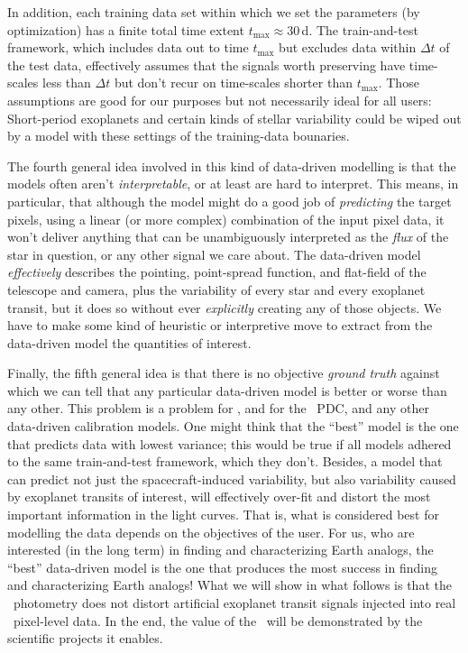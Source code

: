 In addition, 
  each training data set within which we set the parameters (by optimization) has a finite total time extent $t_{\max}\approx 30$\,d.
The train-and-test framework, which includes data out to time $t_{\max}$ but excludes data within $\Delta t$ of the test data,
  effectively assumes that the signals worth preserving have time-scales less than $\Delta t$ 
  but don't recur on time-scales shorter than $t_{\max}$.
Those assumptions are good for our purposes but not necessarily ideal for all users:
Short-period exoplanets and certain kinds of stellar variability
  could be wiped out by a model with these settings of the training-data bounaries.

The fourth general idea involved in this kind of data-driven modelling is that the models often aren't \emph{interpretable}, 
  or at least are hard to interpret.
This means, in particular, that although the model might do a good job of \emph{predicting} the target pixels,
  using a linear (or more complex) combination of the input pixel data,
  it won't deliver anything that can be unambiguously interpreted as the \emph{flux} of the star in question,
  or any other signal we care about.
The data-driven model \emph{effectively} describes the pointing, point-spread function, and flat-field
  of the telescope and camera,
  plus the variability of every star and every exoplanet transit,
  but it does so without ever \emph{explicitly} creating any of those objects.
We have to make some kind of heuristic or interpretive move to extract from the data-driven model the quantities of interest.

Finally, the fifth general idea is that there is no objective \emph{ground truth} against which we can tell
  that any particular data-driven model is better or worse than any other.
This problem is a problem for \name, and for the \Kepler\ PDC, and any other data-driven calibration models.
One might think that the ``best'' model is the one that predicts data with lowest variance;
  this would be true if all models adhered to the same train-and-test framework, which they don't.
Besides, a model that can predict not just the spacecraft-induced variability,
  but also variability caused by exoplanet transits of interest, will effectively over-fit and distort the most important information in the light curves.
That is, what is considered best for modelling the data depends on the objectives of the user.
For us, who are interested (in the long term) in finding and characterizing Earth analogs,
  the ``best'' data-driven model is the one that produces the most success in finding and characterizing Earth analogs!
What we will show in what follows is that the \name\ photometry does not distort
  artificial exoplanet transit signals injected into real \Kepler\ pixel-level data.
In the end, the value of the \name\ will be demonstrated by the scientific projects it enables.

